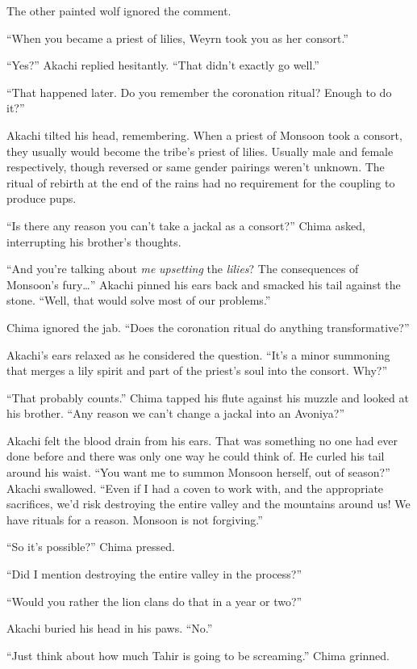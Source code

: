 The other painted wolf ignored the comment.

``When you became a priest of lilies, Weyrn took you as her consort.''

``Yes?'' Akachi replied hesitantly. ``That didn't exactly go well.''

``That happened later. Do you remember the coronation ritual? Enough to do it?''

Akachi tilted his head, remembering. When a priest of Monsoon took a consort, they usually would become the tribe's priest of lilies. Usually male and female respectively, though reversed or same gender pairings weren't unknown. The ritual of rebirth at the end of the rains had no requirement for the coupling to produce pups.

``Is there any reason you can't take a jackal as a consort?'' Chima asked, interrupting his brother's thoughts. 

``And you're talking about \emph{me} \emph{upsetting} the \emph{lilies}? The consequences of Monsoon's fury\ldots'' Akachi pinned his ears back and smacked his tail against the stone. ``Well, that would solve most of our problems.''

Chima ignored the jab. ``Does the coronation ritual do anything transformative?''

Akachi's ears relaxed as he considered the question. ``It's a minor summoning that merges a lily spirit and part of the priest's soul into the consort. Why?''

``That probably counts.'' Chima tapped his flute against his muzzle and looked at his brother. ``Any reason we can't change a jackal into an Avoniya?''

Akachi felt the blood drain from his ears. That was something no one had ever done before and there was only one way he could think of. He curled his tail around his waist. ``You want me to summon Monsoon herself, out of season?'' Akachi swallowed. ``Even if I had a coven to work with, and the appropriate sacrifices, we'd risk destroying the entire valley and the mountains around us! We have rituals for a reason. Monsoon is not forgiving.''

``So it's possible?'' Chima pressed. 

``Did I mention destroying the entire valley in the process?''

``Would you rather the lion clans do that in a year or two?''

Akachi buried his head in his paws. ``No.''

``Just think about how much Tahir is going to be screaming.'' Chima grinned.


